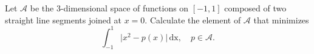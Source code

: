 \begin{problem}
Let $\mathcal{A}$ be the 3-dimensional space of functions on $[-1,1]$ composed of two straight line segments joined at $x = 0$. Calculate the element of $\mathcal{A}$ that minimizes
\begin{equation*}
\int_{-1}^1 \lvert x^2 - p(x) \rvert \, \text{dx}, \quad p \in \mathcal{A}.
\end{equation*}
\end{problem}


\begin{solution}

\end{solution}

